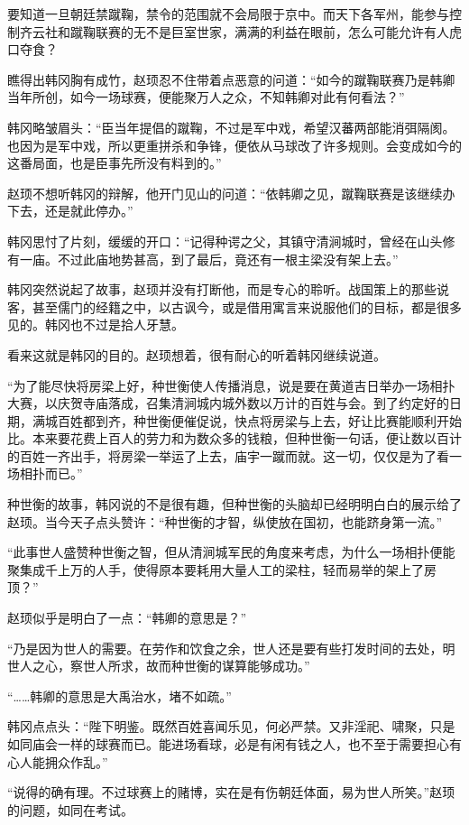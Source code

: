要知道一旦朝廷禁蹴鞠，禁令的范围就不会局限于京中。而天下各军州，能参与控制齐云社和蹴鞠联赛的无不是巨室世家，满满的利益在眼前，怎么可能允许有人虎口夺食？

瞧得出韩冈胸有成竹，赵顼忍不住带着点恶意的问道：“如今的蹴鞠联赛乃是韩卿当年所创，如今一场球赛，便能聚万人之众，不知韩卿对此有何看法？”

韩冈略皱眉头：“臣当年提倡的蹴鞠，不过是军中戏，希望汉蕃两部能消弭隔阂。也因为是军中戏，所以更重拼杀和争锋，便依从马球改了许多规则。会变成如今的这番局面，也是臣事先所没有料到的。”

赵顼不想听韩冈的辩解，他开门见山的问道：“依韩卿之见，蹴鞠联赛是该继续办下去，还是就此停办。”

韩冈思忖了片刻，缓缓的开口：“记得种谔之父，其镇守清涧城时，曾经在山头修有一庙。不过此庙地势甚高，到了最后，竟还有一根主梁没有架上去。”

韩冈突然说起了故事，赵顼并没有打断他，而是专心的聆听。战国策上的那些说客，甚至儒门的经籍之中，以古讽今，或是借用寓言来说服他们的目标，都是很多见的。韩冈也不过是拾人牙慧。

看来这就是韩冈的目的。赵顼想着，很有耐心的听着韩冈继续说道。

“为了能尽快将房梁上好，种世衡使人传播消息，说是要在黄道吉日举办一场相扑大赛，以庆贺寺庙落成，召集清涧城内城外数以万计的百姓与会。到了约定好的日期，满城百姓都到齐，种世衡便催促说，快点将房梁与上去，好让比赛能顺利开始比。本来要花费上百人的劳力和为数众多的钱粮，但种世衡一句话，便让数以百计的百姓一齐出手，将房梁一举运了上去，庙宇一蹴而就。这一切，仅仅是为了看一场相扑而已。”

种世衡的故事，韩冈说的不是很有趣，但种世衡的头脑却已经明明白白的展示给了赵顼。当今天子点头赞许：“种世衡的才智，纵使放在国初，也能跻身第一流。”

“此事世人盛赞种世衡之智，但从清涧城军民的角度来考虑，为什么一场相扑便能聚集成千上万的人手，使得原本要耗用大量人工的梁柱，轻而易举的架上了房顶？”

赵顼似乎是明白了一点：“韩卿的意思是？”

“乃是因为世人的需要。在劳作和饮食之余，世人还是要有些打发时间的去处，明世人之心，察世人所求，故而种世衡的谋算能够成功。”

“……韩卿的意思是大禹治水，堵不如疏。”

韩冈点点头：“陛下明鉴。既然百姓喜闻乐见，何必严禁。又非淫祀、啸聚，只是如同庙会一样的球赛而已。能进场看球，必是有闲有钱之人，也不至于需要担心有心人能拥众作乱。”

“说得的确有理。不过球赛上的赌博，实在是有伤朝廷体面，易为世人所笑。”赵顼的问题，如同在考试。

